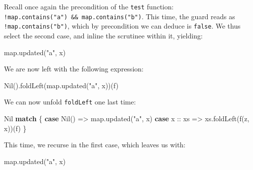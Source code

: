 \documentclass[ignorenonframetext,]{beamer}
\newenvironment{Shaded}{}{}
\newcommand{\FunctionTok}[1]{\textcolor[rgb]{0.02,0.16,0.49}{#1}}
\newcommand{\KeywordTok}[1]{\textcolor[rgb]{0.00,0.44,0.13}{\textbf{#1}}}
\newcommand{\NormalTok}[1]{#1}
\newcommand{\StringTok}[1]{\textcolor[rgb]{0.25,0.44,0.63}{#1}}
\begin{document}
\begin{frame}[fragile]

Recall once again the precondition of the \texttt{test} function:
\texttt{!map.contains("a")\ \&\&\ map.contains("b")}. This time, the
guard reads as \texttt{!map.contains("b")}, which by precondition we can
deduce is \texttt{false}. We thus select the second case, and inline the
scrutinee within it, yielding:

\begin{Shaded}
\begin{Highlighting}[]
\NormalTok{map.}\FunctionTok{updated}\NormalTok{(}\StringTok{"a"}\NormalTok{, x)}
\end{Highlighting}
\end{Shaded}

\end{frame}

\begin{frame}[fragile]

We are now left with the following expression:

\begin{Shaded}
\begin{Highlighting}[]
\FunctionTok{Nil}\NormalTok{().}\FunctionTok{foldLeft}\NormalTok{(map.}\FunctionTok{updated}\NormalTok{(}\StringTok{"a"}\NormalTok{, x))(f)}
\end{Highlighting}
\end{Shaded}

\end{frame}

\begin{frame}[fragile]

We can now unfold \texttt{foldLeft} one last time:

\begin{Shaded}
\begin{Highlighting}[]
\NormalTok{Nil }\KeywordTok{match}\NormalTok{ \{}
  \KeywordTok{case} \FunctionTok{Nil}\NormalTok{()   => map.}\FunctionTok{updated}\NormalTok{(}\StringTok{"a"}\NormalTok{, x)}
  \KeywordTok{case}\NormalTok{ x :: xs => xs.}\FunctionTok{foldLeft}\NormalTok{(}\FunctionTok{f}\NormalTok{(z, x))(f)}
\NormalTok{\}}
\end{Highlighting}
\end{Shaded}

\end{frame}

\begin{frame}[fragile]

This time, we recurse in the first case, which leaves us with:

\begin{Shaded}
\begin{Highlighting}[]
\NormalTok{map.}\FunctionTok{updated}\NormalTok{(}\StringTok{"a"}\NormalTok{, x)}
\end{Highlighting}
\end{Shaded}

\end{frame}
\end{document}
